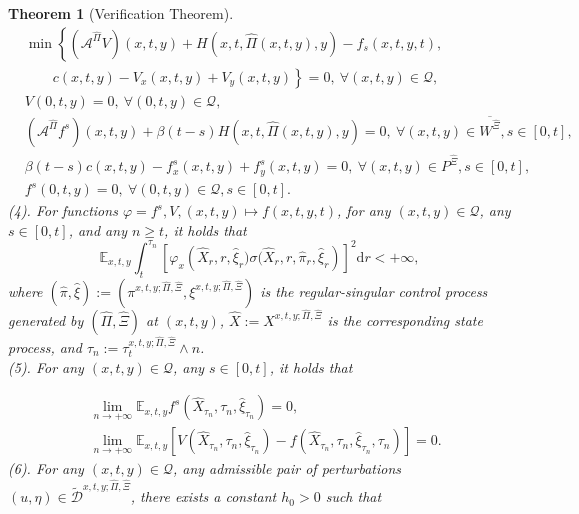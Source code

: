 \documentclass[11pt,reqno]{article}%
\newtheorem{theorem}{Theorem}[section]
\numberwithin{equation}{section}
\begin{document}
\begin{theorem}[Verification Theorem]
\begin{subequations}
\begin{align}
&\min\left\{\left(\mathcal{A}^{\hat{\Pi}}V\right)(x,t,y)+H\left(x,t,\hat{\Pi}(x,t,y),y\right)-f_s(x,t,y,t),\right.\nonumber\\
&\left.\quad \quad c(x,t,y)-V_{x}(x,t,y)+V_{y}(x,t,y)\right\}=0,\ \forall (x,t,y)\in\mathcal{Q}, \label{v}\\
&V(0,t,y)=0,\ \forall(0,t,y)\in\mathcal{Q},\label{vT}\\
&\left(\mathcal{A}^{\hat{\Pi}}f^{s}\right)(x,t,y)+\beta(t-s)H\left(x,t,\hat\Pi(x,t,y),y\right)=0,\ \forall (x,t,y)\in \overline{W^{\hat{\Xi}}}, s\in[0,t],\label{fw}\\
& \beta(t-s)c(x,t,y)-f^{s}_{x}(x,t,y)+f^{s}_{y}(x,t,y)=0,\ \forall (x,t,y)\in P^{\hat{\Xi}}, s\in[0,t],\label{fp}\\
&f^{s}(0,t,y)=0,\ \forall (0,t,y)\in\mathcal{Q}, s\in[0,t].\label{fT}
\end{align}
\end{subequations}
(4). For functions $\varphi=f^{s},V,(x,t,y)\mapsto f(x,t,y,t)$, for any $(x,t,y)\in\mathcal{Q}$, any  $s\in[0,t]$, and any $n\geq t$, it holds that 
\begin{equation}
\mathbb{E}_{x,t,y}\int_{t}^{\tau_n}\left[\varphi_{x}\left(\hat{X}_{r},r,\hat\xi_{r})\sigma(\hat{X}_{r},r,\hat\pi_r,\hat\xi_{r}\right)\right]^{2}\mathrm{d}r<+\infty,
\label{martingale}\end{equation}
where $\left(\hat{\pi},\hat{\xi}\right):=\left(\pi^{x,t,y;\hat{\Pi},\hat{\Xi}},\xi^{x,t,y;\hat{\Pi},\hat{\Xi}}\right)$ is the regular-singular control process generated by $\left(\hat{\Pi},\hat{\Xi}\right)$ at $(x,t,y)$, $\hat{X}:=X^{x,t,y;\hat{\Pi},\hat{\Xi}}$ is the corresponding state process, and $\tau_{n}:=\tau^{x,t,y;\hat{\Pi},\hat{\Xi}}_{t}\wedge n$.\\
(5). For any $(x,t,y)\in\mathcal{Q}$, any $s\in[0,t]$, it holds that 

\begin{align}
&\lim\limits_{n\rightarrow+\infty}\mathbb{E}_{x,t,y}f^{s}\left(\hat{X}_{\tau_{n}},\tau_{n},\hat{\xi}_{\tau_{n}}\right)=0,\label{finfty1}\\
&\lim\limits_{n\rightarrow+\infty}\mathbb{E}_{x,t,y}\left[V\left(\hat{X}_{\tau_{n}},\tau_{n},\hat{\xi}_{\tau_{n}}\right)-f\left(\hat{X}_{\tau_{n}},\tau_{n},\hat{\xi}_{\tau_{n}},\tau_{n}\right)\right]=0.\label{finfty2}
\end{align}
(6). For any $(x,t,y)\in\mathcal{Q}$, any admissible pair of perturbations $(u,\eta)\in\mathcal{\tilde D}^{x,t,y;\hat\Pi,\hat\Xi}$, there exists a constant $h_0>0$ such that


\end{theorem}
\end{document}
